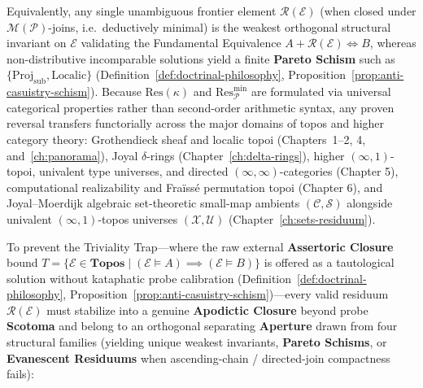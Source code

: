 Equivalently, any single unambiguous frontier element $\mathcal{R}(\mathcal{E})$ (when closed under $\mathcal{M}(\mathcal{P})$-joins, i.e.\ deductively minimal) is the weakest orthogonal structural invariant on $\mathcal{E}$ validating the Fundamental Equivalence $A + \mathcal{R}(\mathcal{E}) \iff B$, whereas non-distributive incomparable solutions yield a finite \textbf{Pareto Schism} such as $\{\mathrm{Proj}_{\mathrm{sub}}, \mathrm{Localic}\}$ (Definition~\ref{def:doctrinal-philosophy}, Proposition~\ref{prop:anti-casuistry-schism}). Because $\mathrm{Res}(\kappa)$ and $\mathrm{Res}_{\mathcal{P}}^{\min}$ are formulated via universal categorical properties rather than second-order arithmetic syntax, any proven reversal transfers functorially across the major domains of topos and higher category theory: Grothendieck sheaf and localic topoi (Chapters~1--2, 4, and~\ref{ch:panorama}), Joyal $\delta$-rings (Chapter~\ref{ch:delta-rings}), higher $(\infty, 1)$-topoi, univalent type universes, and directed $(\infty, \infty)$-categories (Chapter 5), computational realizability and Fraïssé permutation topoi (Chapter 6), and Joyal--Moerdijk algebraic set-theoretic small-map ambients $(\mathcal{C}, \mathcal{S})$ alongside univalent $(\infty, 1)$-topos universes $(\mathcal{X}, \mathcal{U})$ (Chapter~\ref{ch:sets-residuum}).

To prevent the Triviality Trap---where the raw external \textbf{Assertoric Closure} bound $T = \{\mathcal{E} \in \mathbf{Topos} \mid (\mathcal{E} \models A) \implies (\mathcal{E} \models B)\}$ is offered as a tautological solution without kataphatic probe calibration (Definition~\ref{def:doctrinal-philosophy}, Proposition~\ref{prop:anti-casuistry-schism})---every valid residuum $\mathcal{R}(\mathcal{E})$ must stabilize into a genuine \textbf{Apodictic Closure} beyond probe \textbf{Scotoma} and belong to an orthogonal separating \textbf{Aperture} drawn from four structural families (yielding unique weakest invariants, \textbf{Pareto Schisms}, or \textbf{Evanescent Residuums} when ascending-chain / directed-join compactness fails):

